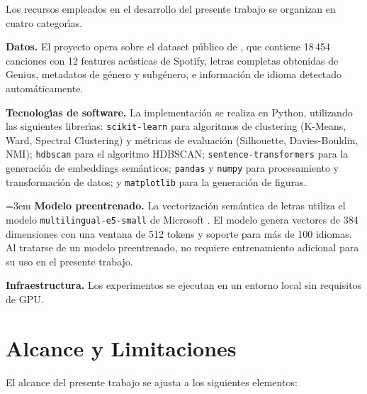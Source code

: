 Los recursos empleados en el desarrollo del presente trabajo se organizan en cuatro categor\'{\i}as.

\textbf{Datos.} El proyecto opera sobre el dataset p\'{u}blico de \textcite{nakhaee_2020_spotify_lyrics}, que contiene 18\,454 canciones con 12 features ac\'{u}sticas de Spotify, letras completas obtenidas de Genius, metadatos de g\'{e}nero y subg\'{e}nero, e informaci\'{o}n de idioma detectado autom\'{a}ticamente.

\textbf{Tecnolog\'{\i}as de software.} La implementaci\'{o}n se realiza en Python, utilizando las siguientes librer\'{\i}as: \texttt{scikit-learn} para algoritmos de clustering (K-Means, Ward, Spectral Clustering) y m\'{e}tricas de evaluaci\'{o}n (Silhouette, Davies-Bouldin, NMI); \texttt{hdbscan} para el algoritmo HDBSCAN; \texttt{sentence-transformers} para la generaci\'{o}n de embeddings sem\'{a}nticos; \texttt{pandas} y \texttt{numpy} para procesamiento y transformaci\'{o}n de datos; y \texttt{matplotlib} para la generaci\'{o}n de figuras.

{\emergencystretch=3em
\textbf{Modelo preentrenado.} La vectorizaci\'{o}n sem\'{a}ntica de letras utiliza el modelo \texttt{multilingual-}\allowbreak\texttt{e5-}\allowbreak\texttt{small} de Microsoft \parencite{wang_2022_e5}. El modelo genera vectores de 384 dimensiones con una ventana de 512 tokens y soporte para m\'{a}s de 100 idiomas. Al tratarse de un modelo preentrenado, no requiere entrenamiento adicional para su uso en el presente trabajo.\par}

\textbf{Infraestructura.} Los experimentos se ejecutan en un entorno local sin requisitos de GPU.

\section{Alcance y Limitaciones}
\label{sec:alcance-limitaciones}

El alcance del presente trabajo se ajusta a los siguientes elementos:

